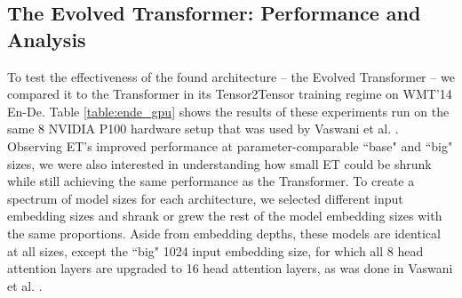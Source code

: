\documentclass{article}
\begin{document}
\subsection{The Evolved Transformer: Performance and Analysis}

To test the effectiveness of the found architecture -- the Evolved Transformer -- we compared it to the Transformer in its Tensor2Tensor training regime on WMT'14 En-De. Table \ref{table:ende_gpu} shows the results of these experiments run on the same 8 NVIDIA P100 hardware setup that was used by Vaswani et al. .  Observing ET's improved performance at parameter-comparable ``base" and ``big" sizes, we were also interested in understanding how small ET could be shrunk while still achieving the same performance as the Transformer. To create a spectrum of model sizes for each architecture, we selected different input embedding sizes and shrank or grew the rest of the model embedding sizes with the same proportions. Aside from embedding depths, these models are identical at all sizes, except the ``big" 1024 input embedding size, for which all 8 head attention layers are upgraded to 16 head attention layers, as was done in Vaswani et al. .
\end{document}
